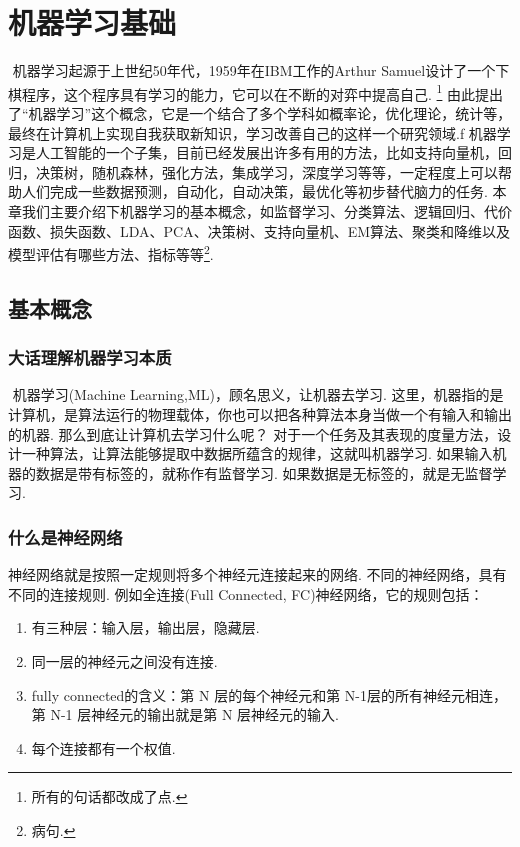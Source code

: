 \chapter{机器学习基础}
\label{ux7b2cux4e8cux7ae0-ux673aux5668ux5b66ux4e60ux57faux7840}
​ 机器学习起源于上世纪50年代，1959年在IBM工作的Arthur Samuel设计了一个下棋程序，这个程序具有学习的能力，它可以在不断的对弈中提高自己.
\footnote{所有的句话都改成了点.}
由此提出了``机器学习''这个概念，它是一个结合了多个学科如概率论，优化理论，统计等，最终在计算机上实现自我获取新知识，学习改善自己的这样一个研究领域.f
机器学习是人工智能的一个子集，目前已经发展出许多有用的方法，比如支持向量机，回归，决策树，随机森林，强化方法，集成学习，深度学习等等，一定程度上可以帮助人们完成一些数据预测，自动化，自动决策，最优化等初步替代脑力的任务.
本章我们主要介绍下机器学习的基本概念，如监督学习、分类算法、逻辑回归、代价函数、损失函数、LDA、PCA、决策树、支持向量机、EM算法、聚类和降维以及模型评估有哪些方法、指标等等\footnote{病句.}.

\section{基本概念}
\label{ux57faux672cux6982ux5ff5}
\subsection{大话理解机器学习本质}
\label{ux5927ux8bddux7406ux89e3ux673aux5668ux5b66ux4e60ux672cux8d28}
​ 机器学习(Machine Learning,ML)，顾名思义，让机器去学习.
这里，机器指的是计算机，是算法运行的物理载体，你也可以把各种算法本身当做一个有输入和输出的机器.
那么到底让计算机去学习什么呢？
对于一个任务及其表现的度量方法，设计一种算法，让算法能够提取中数据所蕴含的规律，这就叫机器学习.
如果输入机器的数据是带有标签的，就称作有监督学习.
如果数据是无标签的，就是无监督学习.

\subsection{什么是神经网络}
\label{ux4ec0ux4e48ux662fux795eux7ecfux7f51ux7edc}
神经网络就是按照一定规则将多个神经元连接起来的网络.
不同的神经网络，具有不同的连接规则.
例如全连接(Full Connected, FC)神经网络，它的规则包括：
\begin{enumerate}
\item 有三种层：输入层，输出层，隐藏层.
\item 同一层的神经元之间没有连接.
\item fully connected的含义：第 N 层的每个神经元和第 N-1层的所有神经元相连，第 N-1 层神经元的输出就是第 N 层神经元的输入.
\item 每个连接都有一个权值.
\end{enumerate}
